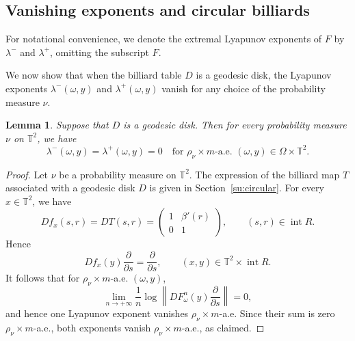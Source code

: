 \documentclass[a4paper,12pt,reqno]{amsart}
\numberwithin{equation}{section}
\newtheorem{lemma}[theorem]{Lemma}
\newcommand{\Tt}{{\mathbb{T}}}
\begin{document}

\subsection{Vanishing exponents and circular billiards}
\label{sss:abscont}

For notational convenience, we denote the extremal Lyapunov exponents of $F$ by $\lambda^-$ and $\lambda^+$, omitting the subscript $F$. 


We now show that when the billiard table $D$ is a geodesic disk, the Lyapunov exponents $\lambda^-(\omega,y)$ and $\lambda^+(\omega,y)$ vanish for any choice of the probability measure $\nu$.

\begin{lemma}
\label{lemma: 8}
Suppose that $D$ is a geodesic disk. Then for every probability measure $\nu$ on $\Tt^2$, we have 
\[
\lambda^-(\omega,y) = \lambda^+(\omega, y) = 0 \quad \text{for }\rho_\nu \times m \text{-a.e. }(\omega, y) \in \Omega \times \Tt^2.
\]
\end{lemma}

\begin{proof} 
Let $\nu$ be a probability measure on $\Tt^2$. The expression of the billiard map $T$ associated with a geodesic disk $D$ is given in Section~\ref{su:circular}. For every $x\in \Tt^2$, we have
\[
Df_x(s,r)=DT(s,r)
=
\begin{pmatrix}
1 & \beta'(r)\\
0 & 1
\end{pmatrix},
\qquad (s,r)\in \operatorname{int} R.
\]
Hence
\[
Df_x(y)\frac{\partial}{\partial s}
=
\frac{\partial}{\partial s},
\qquad
(x,y)\in \Tt^2\times \operatorname{int} R.
\]
It follows that for $\rho_\nu\times m$-a.e. $(\omega,y)$, 
\[
\lim_{n\to+\infty}
\frac1n
\log\left\|
D F_\omega^n(y)\frac{\partial}{\partial s}
\right\|
=0,
\]
and hence one Lyapunov exponent vanishes $\rho_\nu\times m$-a.e. Since their sum is zero $\rho_\nu\times m$-a.e., both exponents vanish $\rho_\nu\times m$-a.e., as claimed.
\end{proof}
\end{document}
